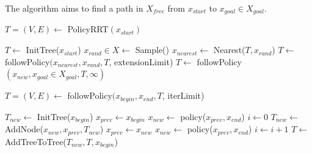 \documentclass[../thesis.tex]{subfiles}
\begin{document}
The algorithm aims to find a path in $X_{free}$ from $x_{start}$ to $x_{goal} \in X_{goal}$.


\begin{algorithm}
\caption{$T=(V,E) \leftarrow$ PolicyRRT$(x_{start})$}\label{euclid}
\begin{algorithmic}[1]
\State $T \leftarrow$ InitTree($x_{start}$)
\State $x_{rand} \in X \leftarrow$ Sample()
\State $x_{nearest} \leftarrow $ Nearest($T, x_{rand}$)
\State $T \leftarrow $ followPolicy$(x_{nearest}, x_{rand}, T$, extensionLimit)
\State $T \leftarrow $ followPolicy$(x_{new}, x_{goal} \in X_{goal}, T, \infty)$
\EndIf
\EndWhile
\end{algorithmic}
\end{algorithm}

\begin{algorithm}
\caption{$T=(V,E) \leftarrow$ followPolicy$(x_{begin}, x_{end}, T$, iterLimit)}\label{euclid}
\begin{algorithmic}[1]
\State $T_{new} \leftarrow $ InitTree($x_{begin}$)
\State $x_{prev} \leftarrow x_{begin}$
\State $x_{new} \leftarrow $ policy($x_{prev}, x_{end}$)
\State $i \leftarrow 0$
\State $T_{new} \leftarrow $ AddNode($x_{new}, x_{prev}, T_{new}$)
\State $x_{prev} \leftarrow x_{new}$ 
\State $x_{new} \leftarrow $ policy($x_{prev}, x_{end}$)
\State $i \leftarrow i+1$
\EndWhile
\State $T \leftarrow $ AddTreeToTree($T_{new}, T, x_{begin}$)
\end{algorithmic}
\end{algorithm}


\end{document}
